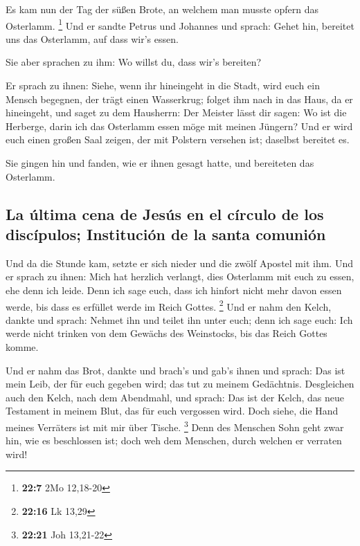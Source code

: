  Es kam nun der Tag der süßen Brote, an welchem man musste
opfern das Osterlamm. \footnote{\textbf{22:7} 2Mo 12,18-20}
 Und er sandte Petrus und Johannes und sprach: Gehet hin,
bereitet uns das Osterlamm, auf dass wir's essen.

 Sie aber sprachen zu ihm: Wo willst du, dass wir's
bereiten?

 Er sprach zu ihnen: Siehe, wenn ihr hineingeht in die
Stadt, wird euch ein Mensch begegnen, der trägt einen Wasserkrug; folget
ihm nach in das Haus, da er hineingeht,  und saget zu dem
Hausherrn: Der Meister lässt dir sagen: Wo ist die Herberge, darin ich
das Osterlamm essen möge mit meinen Jüngern?  Und er wird
euch einen großen Saal zeigen, der mit Polstern versehen ist; daselbst
bereitet es.

 Sie gingen hin und fanden, wie er ihnen gesagt hatte,
und bereiteten das Osterlamm.

\hypertarget{la-uxfaltima-cena-de-jesuxfas-en-el-cuxedrculo-de-los-discuxedpulos-instituciuxf3n-de-la-santa-comuniuxf3n}{%
\subsection{La última cena de Jesús en el círculo de los discípulos;
Institución de la santa
comunión}\label{la-uxfaltima-cena-de-jesuxfas-en-el-cuxedrculo-de-los-discuxedpulos-instituciuxf3n-de-la-santa-comuniuxf3n}}

 Und da die Stunde kam, setzte er sich nieder und die
zwölf Apostel mit ihm.  Und er sprach zu ihnen: Mich hat
herzlich verlangt, dies Osterlamm mit euch zu essen, ehe denn ich leide.
 Denn ich sage euch, dass ich hinfort nicht mehr davon
essen werde, bis dass es erfüllet werde im Reich Gottes. \footnote{\textbf{22:16}
  Lk 13,29}  Und er nahm den Kelch, dankte und sprach:
Nehmet ihn und teilet ihn unter euch;  denn ich sage
euch: Ich werde nicht trinken von dem Gewächs des Weinstocks, bis das
Reich Gottes komme.

 Und er nahm das Brot, dankte und brach's und gab's ihnen
und sprach: Das ist mein Leib, der für euch gegeben wird; das tut zu
meinem Gedächtnis.  Desgleichen auch den Kelch, nach dem
Abendmahl, und sprach: Das ist der Kelch, das neue Testament in meinem
Blut, das für euch vergossen wird.  Doch siehe, die Hand
meines Verräters ist mit mir über Tische. \footnote{\textbf{22:21} Joh
  13,21-22}  Denn des Menschen Sohn geht zwar hin, wie es
beschlossen ist; doch weh dem Menschen, durch welchen er verraten wird!

